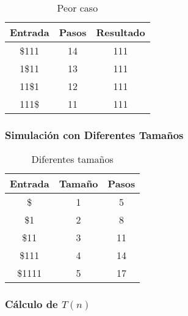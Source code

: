 \documentclass{uc3mpracticas}
\begin{document}
  \begin{table}[!h]
    \centering
  \begin{tabular}{|c|c|c|}
  \hline
  \textbf{Entrada} & \textbf{Pasos} & \textbf{Resultado} \\ \hline
  \$111            & 14             & 111                \\ \hline
  1\$11            & 13             & 111                \\ \hline
  11\$1            & 12             & 111                \\ \hline
  111\$            & 11             & 111                \\ \hline
  \end{tabular}
  \caption{Peor caso}
  \end{table}

  \subsubsection{Simulación con Diferentes Tamaños}

  \begin{table}[!h]
    \centering
  \begin{tabular}{|c|c|c|}
  \hline

  \textbf{Entrada} & \textbf{Tamaño} & \textbf{Pasos} \\ \hline

  \$      & 1               & 5              \\ \hline
  \$1     & 2               & 8              \\ \hline
  \$11    & 3               & 11             \\ \hline
  \$111   & 4               & 14             \\ \hline
  \$1111           & 5               & 17             \\ \hline
  \end{tabular}
  \caption{Diferentes tamaños}
  \end{table}



  \subsubsection{Cálculo de $T(n)$}
\end{document}
